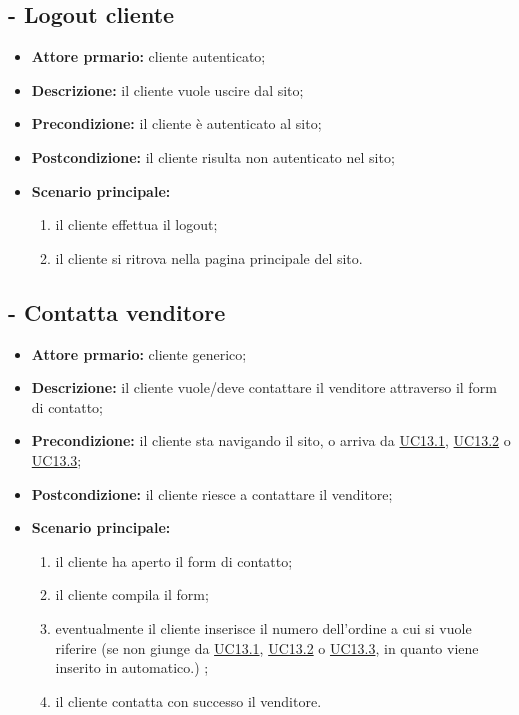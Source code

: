 \stepUserCase
\subsection{ - Logout cliente}
\begin{itemize}
    \item \textbf{Attore prmario:} cliente autenticato;
    \item \textbf{Descrizione:} il cliente vuole uscire dal sito;
    \item \textbf{Precondizione:} il cliente è autenticato al sito;
    \item \textbf{Postcondizione:} il cliente risulta non autenticato nel sito;
    \item \textbf{Scenario principale:}
          \begin{enumerate}
              \item il cliente effettua il logout;
              \item il cliente si ritrova nella pagina principale del sito.
          \end{enumerate}
\end{itemize}

\stepUserCase
\subsection{ - Contatta venditore}
\begin{itemize}
    \item \textbf{Attore prmario:} cliente generico;
    \item \textbf{Descrizione:} il cliente vuole/deve contattare il venditore attraverso il form di contatto;
    \item \textbf{Precondizione:} il cliente sta navigando il sito, o arriva da \hyperref[UC13.1]{UC13.1}, \hyperref[UC13.2]{UC13.2} o \hyperref[UC13.3]{UC13.3};
    \item \textbf{Postcondizione:} il cliente riesce a contattare il venditore;
    \item \textbf{Scenario principale:}
          \begin{enumerate}
              \item il cliente ha aperto il form di contatto;
              \item il cliente compila il form;
              \item eventualmente il cliente inserisce il numero dell'ordine a cui si vuole riferire (se non giunge da \hyperref[UC13.1]{UC13.1}, \hyperref[UC13.2]{UC13.2} o \hyperref[UC13.3]{UC13.3}, in quanto viene inserito in automatico.) ;
              \item il cliente contatta con successo il venditore.
          \end{enumerate}
\end{itemize}


